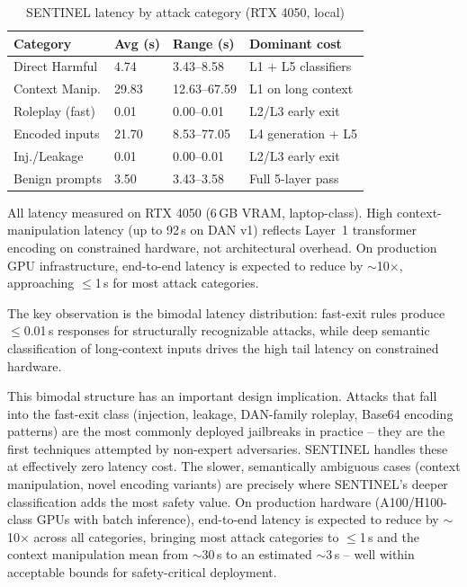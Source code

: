 \documentclass[conference]{IEEEtran}
\begin{document}
\begin{table}[t]
\centering
\caption{SENTINEL latency by attack category (RTX 4050, local)}
\label{tab:latency}
\small
\renewcommand{\arraystretch}{1.2}
\begin{tabular}{@{}p{2.1cm}p{1.25cm}p{1.5cm}p{1.6cm}@{}}
\toprule
\rowcolor{headerblue!14}
\textbf{Category} & \textbf{Avg (s)} & \textbf{Range (s)} & \textbf{Dominant cost} \\
\midrule
Direct Harmful   & 4.74  & 3.43--8.58   & L1 + L5 classifiers \\
\rowcolor{lightgray}
Context Manip.   & 29.83 & 12.63--67.59 & L1 on long context \\
Roleplay (fast)  & 0.01  & 0.00--0.01   & L2/L3 early exit \\
\rowcolor{lightgray}
Encoded inputs   & 21.70 & 8.53--77.05  & L4 generation + L5 \\
Inj./Leakage     & 0.01  & 0.00--0.01   & L2/L3 early exit \\
\rowcolor{lightgray}
Benign prompts   & 3.50  & 3.43--3.58   & Full 5-layer pass \\
\bottomrule
\end{tabular}
\vspace{2pt}
{\footnotesize All latency measured on RTX 4050 (6\,GB VRAM, laptop-class).
High context-manipulation latency (up to 92\,s on DAN v1) reflects
Layer~1 transformer encoding on constrained hardware, not architectural overhead.
On production GPU infrastructure, end-to-end latency is expected to reduce
by $\sim$10$\times$, approaching $\leq$1\,s for most attack categories.}
\end{table}

The key observation is the bimodal latency distribution: fast-exit rules
produce $\leq$0.01\,s responses for structurally recognizable attacks, while
deep semantic classification of long-context inputs drives the high tail
latency on constrained hardware.

This bimodal structure has an important design implication.
Attacks that fall into the fast-exit class (injection, leakage, DAN-family
roleplay, Base64 encoding patterns) are the most commonly deployed jailbreaks
in practice -- they are the first techniques attempted by non-expert
adversaries.
SENTINEL handles these at effectively zero latency cost.
The slower, semantically ambiguous cases (context manipulation, novel encoding
variants) are precisely where SENTINEL's deeper classification adds the most
safety value.
On production hardware (A100/H100-class GPUs with batch inference),
end-to-end latency is expected to reduce by $\sim$10$\times$ across all
categories, bringing most attack categories to $\leq$1\,s and the
context manipulation mean from $\sim$30\,s to an estimated $\sim$3\,s
-- well within acceptable bounds for safety-critical deployment.
\end{document}
